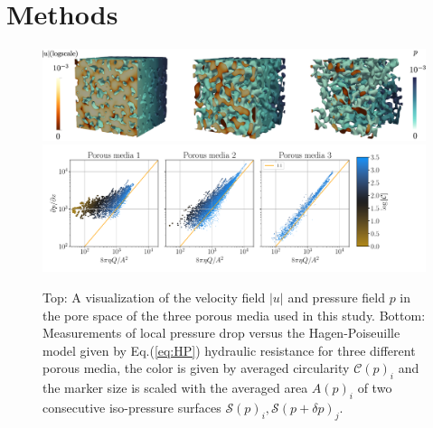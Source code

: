 \documentclass[draft]{agujournal2019}
\begin{document}
\section{Methods}
\begin{figure}[t!]
\includegraphics[width=1.0\linewidth]{figures/DNS_overview.eps}
\includegraphics[width=1.2\linewidth]{figures/infi_dpdx_3.pdf}
\caption{Top: A visualization of the velocity field $|u|$ and pressure field $p$ in the pore space of the three porous media used in this study. Bottom: Measurements of local pressure drop versus the Hagen-Poiseuille model given by Eq.(\ref{eq:HP}) hydraulic resistance for three different porous media, the color is given by averaged circularity $\mathcal{C}(p)_i$ and the marker size is scaled with the averaged area $A(p)_i$ of two consecutive iso-pressure surfaces $\mathcal{S}(p)_i,\mathcal{S}(p+\delta p)_j$. }
\label{fig:DNS}
\end{figure}
\end{document}
